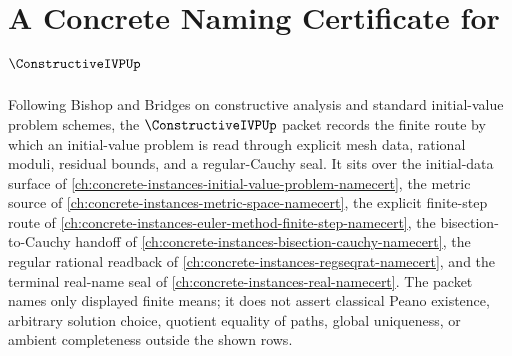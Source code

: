 \chapter{A Concrete Naming Certificate for $\ConstructiveIVPUp$}
\label{ch:concrete-instances-constructive-ivp-namecert}

Following Bishop and Bridges on constructive analysis and standard initial-value problem schemes, the $\ConstructiveIVPUp$ packet records the finite route by which an initial-value problem is read through explicit mesh data, rational moduli, residual bounds, and a regular-Cauchy seal. It sits over the initial-data surface of \autoref{ch:concrete-instances-initial-value-problem-namecert}, the metric source of \autoref{ch:concrete-instances-metric-space-namecert}, the explicit finite-step route of \autoref{ch:concrete-instances-euler-method-finite-step-namecert}, the bisection-to-Cauchy handoff of \autoref{ch:concrete-instances-bisection-cauchy-namecert}, the regular rational readback of \autoref{ch:concrete-instances-regseqrat-namecert}, and the terminal real-name seal of \autoref{ch:concrete-instances-real-namecert}. The packet names only displayed finite means; it does not assert classical Peano existence, arbitrary solution choice, quotient equality of paths, global uniqueness, or ambient completeness outside the shown rows.

